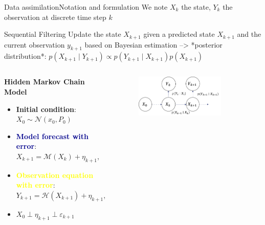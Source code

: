 \documentclass[aspectratio=169]{beamer} %
\begin{document}
\begin{frame}{Data assimilation}{Notation and formulation}
    \small
    We note $X_k$ the state, $Y_k$ the observation at discrete time step $k$
    \begin{block}{Sequential Filtering}
        Update the state $X_{k+1}$ given a predicted state $X_{k+1}$
        and the current observation $y_{k+1}$ based on Bayesian estimation --> *posterior distribution*: $p(X_{k+1} \mid Y_{k+1}) \propto p(Y_{k+1} \mid X_{k+1}) p(X_{k+1})$
    \end{block}
    \vfill
    \begin{columns}
        \begin{column}{0.5\textwidth}
            \textbf{Hidden Markov Chain Model}
            \begin{itemize}
                \item \textbf{Initial condition}: $X_0 \sim \mathcal N(x_0, P_0)$
                \item \textcolor{darkblue}{\textbf{Model forecast with error}}:
                      $X_{k+1} = \mathcal M(X_k) + \eta_{k+1},\quad \eta_{k+1} \sim \mathcal N(0, P_{k+1})$
                \item \textcolor{yellow}{\textbf{Observation equation with error}}:
                      $Y_{k+1} = \mathcal H(X_{k+1}) + \eta_{k+1},\quad \varepsilon_{k+1} \sim \mathcal N(0, R_{k+1})$
                \item $X_0 \perp \eta_{k+1} \perp \varepsilon_{k+1}$
            \end{itemize}
        \end{column}
        \begin{column}{0.5\textwidth}
            \begin{figure}
                \centering
                \includegraphics[width=0.8\textwidth]{images/markov_chain.png}
            \end{figure}
        \end{column}
    \end{columns}
\end{frame}
\end{document}

